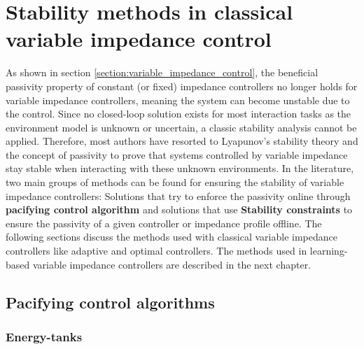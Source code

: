 \chapter{Stability methods in classical variable impedance control}
\label{chapter:classical_variable_impedance}


As shown in section \ref{section:variable_impedance_control}, the beneficial passivity property of constant (or fixed) impedance controllers no longer holds for variable impedance controllers, meaning the system can become unstable due to the control. Since no closed-loop solution exists for most interaction tasks as the environment model is unknown or uncertain, a classic stability analysis cannot be applied. Therefore, most authors have resorted to Lyapunov's stability theory and the concept of passivity to prove that systems controlled by variable impedance stay stable when interacting with these unknown environments. In the literature, two main groups of methods can be found for ensuring the stability of variable impedance controllers: Solutions that try to enforce the passivity online through \textbf{pacifying control algorithm} and solutions that use \textbf{Stability constraints} to ensure the passivity of a given controller or impedance profile offline. The following sections discuss the methods used with classical variable impedance controllers like adaptive and optimal controllers. The methods used in learning-based variable impedance controllers are described in the next chapter.

\section{Pacifying control algorithms}

\subsection{Energy-tanks}

